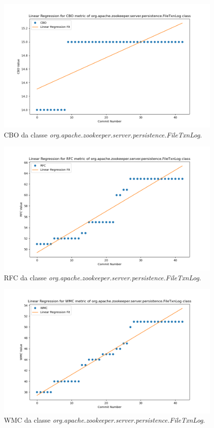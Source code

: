 \begin{figure}[h]
    \centering
    \includegraphics[width=0.8\linewidth]{figuras/343-83cf0a93c37759334fab885c2010fa0b7d953f52/Class-org.apache.zookeeper.server.persistence.FileTxnLog/CBO.png}
    \caption{CBO da classe \textit{org.apache.zookeeper.server.persistence.FileTxnLog}.}
    \label{fig:CBO3xPerformanceClass}
\end{figure}

\begin{figure}[h]
    \centering
    \includegraphics[width=0.8\linewidth]{figuras/343-83cf0a93c37759334fab885c2010fa0b7d953f52/Class-org.apache.zookeeper.server.persistence.FileTxnLog/RFC.png}
    \caption{RFC da classe \textit{org.apache.zookeeper.server.persistence.FileTxnLog}.}
    \label{fig:RFC3xPerformanceClass}
\end{figure}

\begin{figure}[h]
    \centering
    \includegraphics[width=0.8\linewidth]{figuras/343-83cf0a93c37759334fab885c2010fa0b7d953f52/Class-org.apache.zookeeper.server.persistence.FileTxnLog/WMC.png}
    \caption{WMC da classe \textit{org.apache.zookeeper.server.persistence.FileTxnLog}.}
    \label{fig:WMC3xPerformanceClass}
\end{figure}

